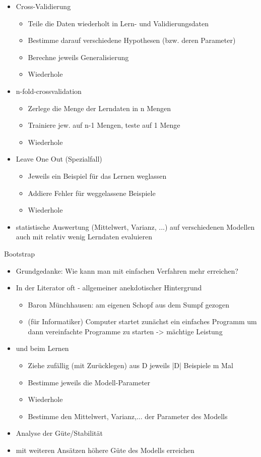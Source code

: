 \documentclass[paper=a4, fontsize=11pt]{scrartcl} %
\numberwithin{equation}{section} %
\numberwithin{figure}{section} %
\numberwithin{table}{section} %
\begin{document}
\begin{itemize}
\item Cross-Validierung
\begin{itemize}
\item Teile die Daten wiederholt in Lern- und Validierungsdaten
\item Bestimme darauf verschiedene Hypothesen (bzw. deren Parameter)
\item Berechne jeweils Generalisierung
\item Wiederhole
\end{itemize}
\item n-fold-crossvalidation
\begin{itemize}
\item Zerlege die Menge der Lerndaten in n Mengen
\item Trainiere jew. auf n-1 Mengen, teste auf 1 Menge
\item Wiederhole
\end{itemize}
\item Leave One Out (Spezialfall)
\begin{itemize}
\item Jeweils ein Beispiel für das Lernen weglassen
\item Addiere Fehler für weggelassene Beispiele
\item Wiederhole
\end{itemize}
\item statistische Auswertung (Mittelwert, Varianz, ...) auf verschiedenen Modellen auch mit relativ wenig Lerndaten evaluieren
\end{itemize}

Bootstrap
\begin{itemize}
\item Grundgedanke: Wie kann man mit einfachen Verfahren mehr erreichen?
\item In der Literator oft - allgemeiner anekdotischer Hintergrund
\begin{itemize}
\item Baron Münchhausen: am eigenen Schopf aus dem Sumpf gezogen
\item (für Informatiker) Computer startet zunächst ein einfaches Programm um dann vereinfachte Programme zu starten -> mächtige Leistung
\end{itemize}
\item und beim Lernen
\begin{itemize}
\item Ziehe zufällig (mit Zurücklegen) aus D jeweils |D| Beispiele m Mal
\item Bestimme jeweils die Modell-Parameter
\item Wiederhole
\item Bestimme den Mittelwert, Varianz,... der Parameter des Modells
\end{itemize}
\item Analyse der Güte/Stabilität
\item mit weiteren Ansätzen höhere Güte des Modells erreichen
\end{itemize}
\end{document}

